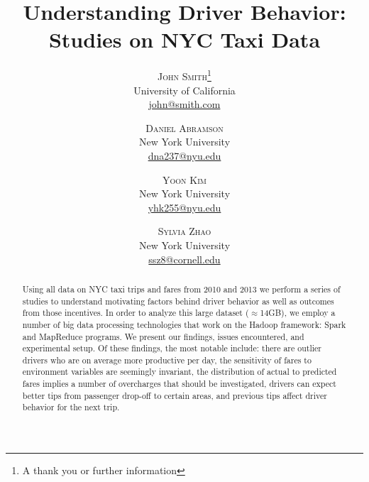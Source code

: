 \documentclass[twoside]{article}
\title{\vspace{-15mm}\fontsize{24pt}{10pt}\selectfont\textbf{Understanding Driver Behavior: Studies on NYC Taxi Data}} %
\author{
\large
\textsc{John Smith}\thanks{A thank you or further information}\\[2mm] %
\normalsize University of California \\ %
\normalsize \href{mailto:john@smith.com}{john@smith.com} %
\vspace{-5mm}
}
\author{
\large
\textsc{Daniel Abramson}\\[2mm] %
\normalsize New York University \\ %
\normalsize \href{mailto:dna237@nyu.edu}{dna237@nyu.edu} %
\vspace{-5mm}
\and
\textsc{Yoon Kim}\\[2mm] %
\normalsize New York University \\ %
\normalsize \href{mailto:yhk255@nyu.edu}{yhk255@nyu.edu} %
\vspace{-5mm}
\and
\textsc{Sylvia Zhao}\\[2mm] %
\normalsize New York University \\ %
\normalsize \href{mailto:ssz8@cornell.edu}{ssz8@cornell.edu} %
\vspace{-5mm}
}
\date{}
\begin{document}
\maketitle %

\thispagestyle{fancy} %


\begin{abstract}

\noindent Using all data on NYC taxi trips and fares from 2010 and 2013 we perform a series of studies to understand motivating factors behind driver behavior as well as outcomes from those incentives. In order to analyze this large dataset ($\approx$14GB), we employ a number of big data processing technologies that work on the Hadoop framework: Spark and MapReduce programs.  We present our findings, issues encountered, and experimental setup. Of these findings, the most notable include: there are outlier drivers who are on average more productive per day, the sensitivity of fares to environment variables are seemingly invariant, the distribution of actual to predicted fares implies a number of overcharges that should be investigated, drivers can expect better tips from passenger drop-off to certain areas, and previous tips affect driver behavior for the next trip. 

\end{abstract}

\end{document}
